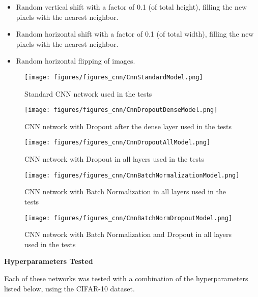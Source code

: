 \documentclass[../CAP6619_term_project_cgarbin.tex]{subfiles}
\begin{document}
\begin{itemize}
\item Random vertical shift with a factor of 0.1 (of total height), filling the new pixels with the nearest neighbor.
\item Random horizontal shift with a factor of 0.1 (of total width), filling the new pixels with the nearest neighbor.
\item Random horizontal flipping of images.

\end{itemize}

\begin{figure}[htbp]
\centerline{\texttt{[image: figures/figures\_cnn/CnnStandardModel.png]}}
\caption{Standard CNN network used in the tests}
\label{fig:CnnStandardModel}
\end{figure}

\begin{figure}[htbp]
\centerline{\texttt{[image: figures/figures\_cnn/CnnDropoutDenseModel.png]}}
\caption{CNN network with Dropout after the dense layer used in the tests}
\label{fig:CnnDropoutDenseModel}
\end{figure}

\begin{figure}[htbp]
\centerline{\texttt{[image: figures/figures\_cnn/CnnDropoutAllModel.png]}}
\caption{CNN network with Dropout in all layers used in the tests}
\label{fig:CnnDropoutAllModel}
\end{figure}

\begin{figure}[htbp]
\centerline{\texttt{[image: figures/figures\_cnn/CnnBatchNormalizationModel.png]}}
\caption{CNN network with Batch Normalization in all layers used in the tests}
\label{fig:CnnBatchNormalizationModel}
\end{figure}

\begin{figure}[htbp]
\centerline{\texttt{[image: figures/figures\_cnn/CnnBatchNormDropoutModel.png]}}
\caption{CNN network with Batch Normalization and Dropout in all layers used in the tests}
\label{fig:CnnBatchNormDropoutModel}
\end{figure}

\medskip
\textbf{Hyperparameters Tested}

Each of these networks was tested with a combination of the hyperparameters listed below, using the CIFAR-10 dataset.
\end{document}
